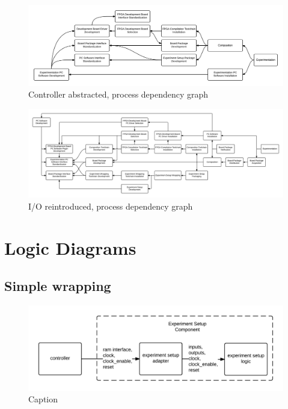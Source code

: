 \documentclass[openright]{template/uva-bachelor-thesis}
\begin{document}
\begin{landscape}
\begin{figure}
\centering
\includegraphics[width=\hsize]{img/processes-dependencies-abstract}
\caption{Controller abstracted, process dependency graph}
\label{fig:dependencies-abstract}
\end{figure}
\end{landscape}

\begin{landscape}
\begin{figure}
\centering
\includegraphics[width=\hsize]{img/processes-dependencies-io}
\caption{I/O reintroduced, process dependency graph}
\label{fig:dependencies-io}
\end{figure}
\end{landscape}





\chapter{Logic Diagrams}

\section{Simple wrapping}
\begin{figure}[h]
    \centering
    \includegraphics[width=\textwidth]{img/logic-wrap-simple}
    \caption{Caption}
    \label{fig:logic-wrap-simple}
\end{figure}
\end{document}
